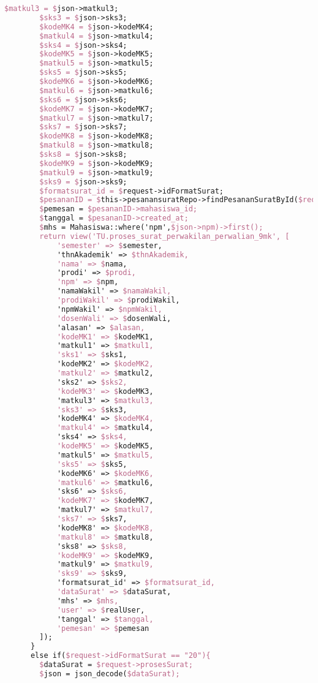 \begin{lstlisting}[language=tex,basicstyle=\tiny,caption=PesanansuratController.php]
        $matkul3 = $json->matkul3;
        $sks3 = $json->sks3;
        $kodeMK4 = $json->kodeMK4;
        $matkul4 = $json->matkul4;
        $sks4 = $json->sks4;
        $kodeMK5 = $json->kodeMK5;
        $matkul5 = $json->matkul5;
        $sks5 = $json->sks5;
        $kodeMK6 = $json->kodeMK6;
        $matkul6 = $json->matkul6;
        $sks6 = $json->sks6;
        $kodeMK7 = $json->kodeMK7;
        $matkul7 = $json->matkul7;
        $sks7 = $json->sks7;
        $kodeMK8 = $json->kodeMK8;
        $matkul8 = $json->matkul8;
        $sks8 = $json->sks8;
        $kodeMK9 = $json->kodeMK9;
        $matkul9 = $json->matkul9;
        $sks9 = $json->sks9;
        $formatsurat_id = $request->idFormatSurat;
        $pesananID = $this->pesanansuratRepo->findPesananSuratById($request->id);
        $pemesan = $pesananID->mahasiswa_id;
        $tanggal = $pesananID->created_at;
        $mhs = Mahasiswa::where('npm',$json->npm)->first();
        return view('TU.proses_surat_perwakilan_perwalian_9mk', [
            'semester' => $semester,
            'thnAkademik' => $thnAkademik,
            'nama' => $nama,
            'prodi' => $prodi,
            'npm' => $npm,
            'namaWakil' => $namaWakil,
            'prodiWakil' => $prodiWakil,
            'npmWakil' => $npmWakil,
            'dosenWali' => $dosenWali,
            'alasan' => $alasan,
            'kodeMK1' => $kodeMK1,
            'matkul1' => $matkul1,
            'sks1' => $sks1,
            'kodeMK2' => $kodeMK2,
            'matkul2' => $matkul2,
            'sks2' => $sks2,
            'kodeMK3' => $kodeMK3,
            'matkul3' => $matkul3,
            'sks3' => $sks3,
            'kodeMK4' => $kodeMK4,
            'matkul4' => $matkul4,
            'sks4' => $sks4,
            'kodeMK5' => $kodeMK5,
            'matkul5' => $matkul5,
            'sks5' => $sks5,
            'kodeMK6' => $kodeMK6,
            'matkul6' => $matkul6,
            'sks6' => $sks6,
            'kodeMK7' => $kodeMK7,
            'matkul7' => $matkul7,
            'sks7' => $sks7,
            'kodeMK8' => $kodeMK8,
            'matkul8' => $matkul8,
            'sks8' => $sks8,
            'kodeMK9' => $kodeMK9,
            'matkul9' => $matkul9,
            'sks9' => $sks9,
            'formatsurat_id' => $formatsurat_id,
            'dataSurat' => $dataSurat,
            'mhs' => $mhs,
            'user' => $realUser,
            'tanggal' => $tanggal,
            'pemesan' => $pemesan
        ]);
      }
      else if($request->idFormatSurat == "20"){
        $dataSurat = $request->prosesSurat;
        $json = json_decode($dataSurat);

\end{lstlisting}
